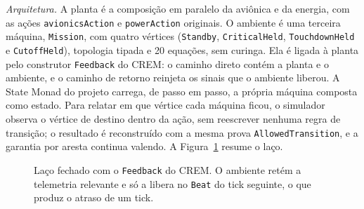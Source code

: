 \documentclass[12pt,a4paper]{article}
\begin{document}
\textit{Arquitetura.} A planta é a composição em paralelo da aviônica e da energia, com as ações \texttt{avionicsAction} e \texttt{powerAction} originais. O ambiente é uma terceira máquina, \texttt{Mission}, com quatro vértices (\texttt{Standby}, \texttt{CriticalHeld}, \texttt{TouchdownHeld} e \texttt{CutoffHeld}), topologia tipada e 20 equações, sem curinga. Ela é ligada à planta pelo construtor \texttt{Feedback} do CREM: o caminho direto contém a planta e o ambiente, e o caminho de retorno reinjeta os sinais que o ambiente liberou. A State Monad do projeto carrega, de passo em passo, a própria máquina composta como estado. Para relatar em que vértice cada máquina ficou, o simulador observa o vértice de destino dentro da ação, sem reescrever nenhuma regra de transição; o resultado é reconstruído com a mesma prova \texttt{AllowedTransition}, e a garantia por aresta continua valendo. A Figura~\ref{fig:laco} resume o laço.

\begin{figure}[h]
\centering
\footnotesize
{}
\caption{Laço fechado com o \texttt{Feedback} do CREM. O ambiente retém a telemetria relevante e só a libera no \texttt{Beat} do tick seguinte, o que produz o atraso de um tick.}
\label{fig:laco}
\end{figure}
\end{document}
